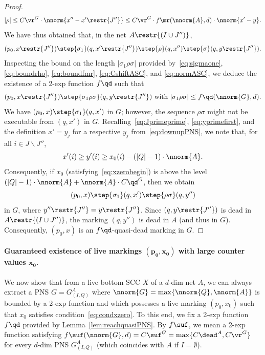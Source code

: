 \begin{proof}
\begin{equation}\label{eq:boundrho}
	|\rho|\leq C\vr^G\cdot \nnorm{x''-x'\restr{J''}}\leq
C\vr^G\cdot f\mr(\nnorm{A},d)\cdot \nnorm{x'-y}.
\end{equation}
We have thus obtained that, in the net $A\restr{(I\cup J'')}$,
\[(p_0,x\restr{J''})\step{\sigma_1}(q,x'\restr{J''})\step{\rho}(q,x'')\step{\sigma}(q,y\restr{J''}).\]
Inspecting the bound on the length $|\sigma_1\rho\sigma|$ provided
by~\eqref{eq:sigmaone}, \eqref{eq:boundrho}, 
\eqref{eq:boundfmr}, \eqref{eq:CshiftASC},
and \eqref{eq:normASC}, we deduce the existence 
 of a 2-exp function $f\qd$ such that
\[(p_0,x\restr{J''})\step{\sigma_1\rho\sigma}(q,y\restr{J''})\text{ with }
|\sigma_1\rho\sigma|\leq f\qd(\nnorm{G},d).\]
We have $(p_0,x)\step{\sigma_1}(q,x')$ in $G$; however, the sequence $\rho\sigma$ might not be executable from $(q,x')$ in
$G$.
Recalling~\eqref{eq:Jprimeprime}, \eqref{eq:yprimefirst}, and the definition 
 $x'=y_j$ for a respective $y_j$ from~\eqref{eq:downupPNS}, we note
 that,
for all $i\in J\smallsetminus J''$,
\[x'(i)\geq y'(i)\geq x_0(i)-(|Q|-1)\cdot\nnorm{A}.\]
Consequently, if $x_0$ (satisfying~\eqref{eq:xzerobegin}) is above the level
$(|Q|-1)\cdot\nnorm{A}+\nnorm{A}\cdot C\qd^G$, then we obtain 
\[(p_0,x)\step{\sigma_1}(q,x')\step{\rho\sigma}(q,y'')\]
in $G$, where ${y''}\restr{J''}=y\restr{J''}$. Since
$(q,y\restr{J''})$ is dead in $A\restr{(I\cup J'')}$, the marking
$(q,y'')$ is dead in $A$ (and thus in $G$). Consequently, $(p_0,x)$ is an $f\qd$-quasi-dead marking in $G$.
\end{proof}	

\paragraph{Guaranteed existence of live markings $\bm{(p_0,x_0)}$ with large
counter values $\bm{x_0}$.}
We now show that from a live bottom SCC $X$ of a $d$-dim net $A$, we can always extract a
PNS $G=G_{(I,Q)}^A$ where $\nnorm{G}=\max\{\nnorm{Q},\nnorm{A}\}$ is
bounded by a 2-exp function and which possesses a live
marking $(p_0,x_0)$ such that $x_0$ satisfies
condition~\eqref{eq:condxzero}. To this end,
we fix a 2-exp function $f\qd$ provided by Lemma~\ref{lem:reachquasiPNS}.
By $f\suf$, we mean a 2-exp function satisfying
$f\suf(\nnorm{G},d)=C\suf^G=\max\{C\dead^{A},C\vr^G\}$ for every $d$-dim
PNS $G_{(I,Q)}^A$ (which coincides with $A$ if $I=\emptyset$).


